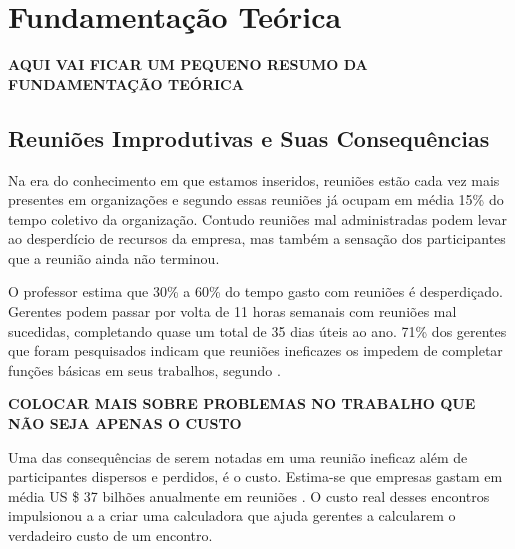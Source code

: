 \chapter[Fundamentação Teórica]{Fundamentação Teórica}
\label{cp:fundamentacao}

\textbf{AQUI VAI FICAR UM PEQUENO RESUMO DA FUNDAMENTAÇÃO TEÓRICA}

\section{Reuniões Improdutivas e Suas Consequências}

Na era do conhecimento em que estamos inseridos, reuniões estão cada vez mais presentes em organizações e segundo \cite{allen2016} essas reuniões já ocupam em média 15\% do tempo coletivo da organização. Contudo reuniões mal administradas podem levar ao desperdício de recursos da empresa, mas também a sensação dos participantes que a reunião ainda não terminou.

O professor \cite{macleod} estima que 30\% a 60\% do tempo gasto com reuniões é desperdiçado. Gerentes podem passar por volta de 11 horas semanais com reuniões mal sucedidas, completando quase um total de 35 dias úteis ao ano. 71\% dos gerentes que foram pesquisados indicam que reuniões ineficazes os impedem de completar funções básicas em seus trabalhos, segundo \cite{perlow}.

\textbf{COLOCAR MAIS SOBRE PROBLEMAS NO TRABALHO QUE NÃO SEJA APENAS O CUSTO}

Uma das consequências de serem notadas em uma reunião ineficaz além de participantes dispersos e perdidos, é o custo. Estima-se que empresas gastam em média US \$ 37 bilhões anualmente em reuniões \cite{baer}. O custo real desses encontros impulsionou a \cite{harvard} a criar uma calculadora que ajuda gerentes a calcularem o verdadeiro custo de um encontro. 